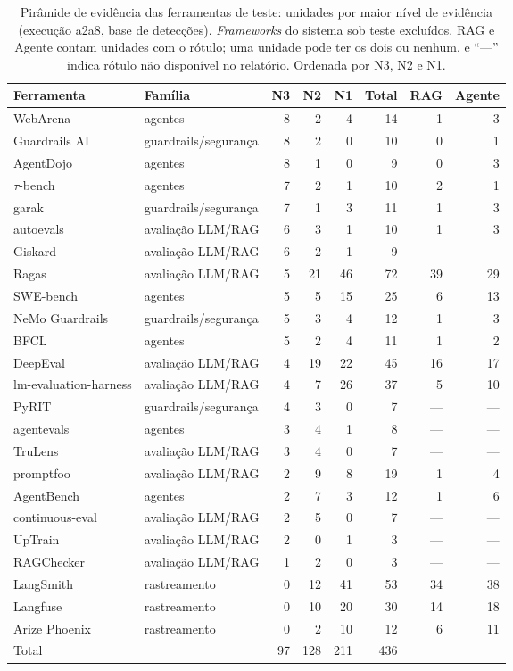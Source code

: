 \documentclass[sigconf]{acmart}
\begin{document}
\begin{table}[t]
  \caption{Pirâmide de evidência das ferramentas de teste: unidades por maior nível de evidência (execução a2a8, base de detecções). \textit{Frameworks} do sistema sob teste excluídos. RAG e Agente contam unidades com o rótulo; uma unidade pode ter os dois ou nenhum, e ``---'' indica rótulo não disponível no relatório. Ordenada por N3, N2 e N1.}
  \label{tab:qp1}
  \small
  \begin{tabular}{llrrrrrr}
    \toprule
    Ferramenta & Família & N3 & N2 & N1 & Total & RAG & Agente \\
    \midrule
    WebArena & agentes & 8 & 2 & 4 & 14 & 1 & 3 \\
    Guardrails AI & guardrails/segurança & 8 & 2 & 0 & 10 & 0 & 1 \\
    AgentDojo & agentes & 8 & 1 & 0 & 9 & 0 & 3 \\
    $\tau$-bench & agentes & 7 & 2 & 1 & 10 & 2 & 1 \\
    garak & guardrails/segurança & 7 & 1 & 3 & 11 & 1 & 3 \\
    autoevals & avaliação LLM/RAG & 6 & 3 & 1 & 10 & 1 & 3 \\
    Giskard & avaliação LLM/RAG & 6 & 2 & 1 & 9 & --- & --- \\
    Ragas & avaliação LLM/RAG & 5 & 21 & 46 & 72 & 39 & 29 \\
    SWE-bench & agentes & 5 & 5 & 15 & 25 & 6 & 13 \\
    NeMo Guardrails & guardrails/segurança & 5 & 3 & 4 & 12 & 1 & 3 \\
    BFCL & agentes & 5 & 2 & 4 & 11 & 1 & 2 \\
    DeepEval & avaliação LLM/RAG & 4 & 19 & 22 & 45 & 16 & 17 \\
    lm-evaluation-harness & avaliação LLM/RAG & 4 & 7 & 26 & 37 & 5 & 10 \\
    PyRIT & guardrails/segurança & 4 & 3 & 0 & 7 & --- & --- \\
    agentevals & agentes & 3 & 4 & 1 & 8 & --- & --- \\
    TruLens & avaliação LLM/RAG & 3 & 4 & 0 & 7 & --- & --- \\
    promptfoo & avaliação LLM/RAG & 2 & 9 & 8 & 19 & 1 & 4 \\
    AgentBench & agentes & 2 & 7 & 3 & 12 & 1 & 6 \\
    continuous-eval & avaliação LLM/RAG & 2 & 5 & 0 & 7 & --- & --- \\
    UpTrain & avaliação LLM/RAG & 2 & 0 & 1 & 3 & --- & --- \\
    RAGChecker & avaliação LLM/RAG & 1 & 2 & 0 & 3 & --- & --- \\
    LangSmith & rastreamento & 0 & 12 & 41 & 53 & 34 & 38 \\
    Langfuse & rastreamento & 0 & 10 & 20 & 30 & 14 & 18 \\
    Arize Phoenix & rastreamento & 0 & 2 & 10 & 12 & 6 & 11 \\
    \midrule
    Total & & 97 & 128 & 211 & 436 & & \\
    \bottomrule
  \end{tabular}
\end{table}
\end{document}
